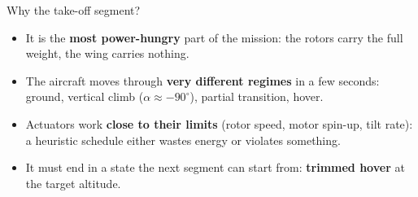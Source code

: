 \documentclass[11pt]{article}
\begin{document}
\begin{frame}{Why the take-off segment?}
  \begin{itemize}
    \item It is the \textbf{most power-hungry} part of the mission: the rotors carry the full weight,
          the wing carries nothing.
    \item The aircraft moves through \textbf{very different regimes} in a few seconds:
          ground, vertical climb ($\alpha \approx -90^\circ$), partial transition, hover.
    \item Actuators work \textbf{close to their limits} (rotor speed, motor spin-up, tilt rate):
          a heuristic schedule either wastes energy or violates something.
    \item It must end in a state the next segment can start from:
          \textbf{trimmed hover} at the target altitude.
  \end{itemize}
  \vspace{2mm}
  \begin{center}
  \end{center}
\end{frame}
\end{document}

